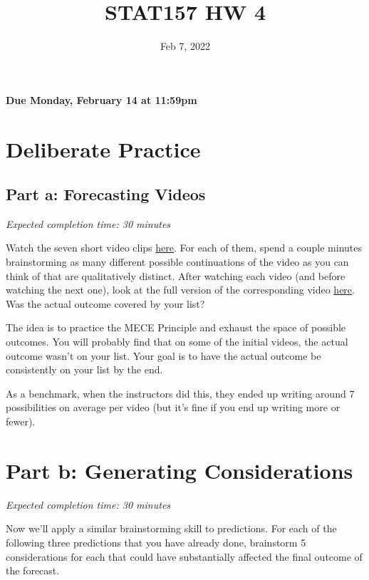 \documentclass[11pt]{article}
\title{STAT157 HW 4}
\date{Feb 7, 2022}
\begin{document}
\maketitle

\hfill \textbf{Due Monday, February 14 at 11:59pm}

\section*{Deliberate Practice}

\subsection*{Part a: Forecasting Videos}

\emph{Expected completion time: 30 minutes}

Watch the seven short video clips \href{http://www.stat157.com/assets/initial_clips.zip}{here}. For each of them, spend a couple minutes brainstorming as many different 
possible continuations of the video as you can think of that are qualitatively distinct. After watching each video (and before watching the next one), look at the 
full version of the corresponding video \href{http://www.stat157.com/assets/full_videos.zip}{here}. Was the actual outcome covered by your list?

The idea is to practice the MECE Principle and exhaust the space of possible outcomes. You will probably find that on some of the initial videos, the actual outcome wasn't on your list. 
Your goal is to have the actual outcome be consistently on your list by the end.

As a benchmark, when the instructors did this, they ended up writing around 7 possibilities on average per video (but it's fine if you end up writing more or fewer).


\section*{Part b: Generating Considerations}

\emph{Expected completion time: 30 minutes}

Now we'll apply a similar brainstorming skill to predictions. 
For each of the following three predictions that you have already done, brainstorm 5 considerations for each that could have substantially affected the final outcome of the forecast.
\end{document}
